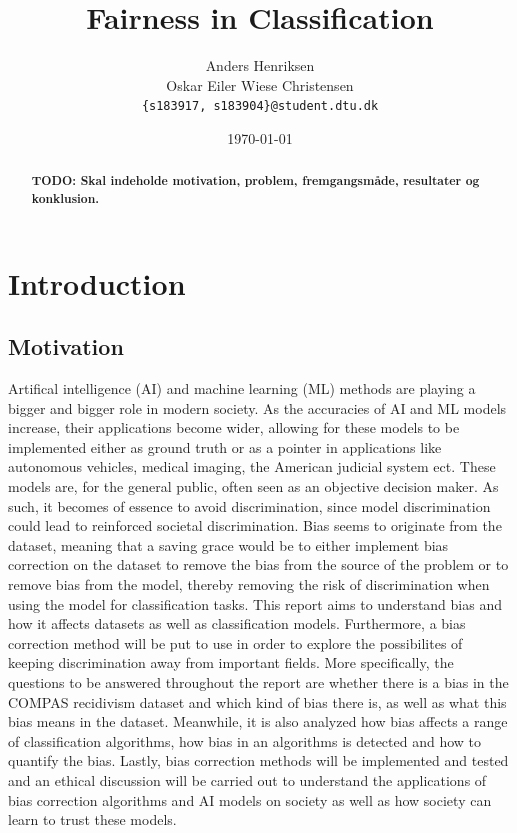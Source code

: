 \documentclass[11pt, fleqn, titlepage]{article}
\title{Fairness in Classification}
\author{Anders Henriksen \\ Oskar Eiler Wiese Christensen  \\ \texttt{\{s183917, s183904\}@student.dtu.dk}}
\date{\today}
\begin{document}
	
	\maketitle
	\begin{abstract}
		\textbf{TODO: Skal indeholde motivation, problem, fremgangsmåde, resultater og konklusion.} \\ \lipsum[1-2]
	\end{abstract}
	\tableofcontents \newpage
	
	\section{Introduction} \label{indledning}
	
	\subsection{Motivation}
	Artifical intelligence (AI) and machine learning (ML) methods are playing a bigger and bigger role in modern society. As the accuracies of AI and ML models increase, their applications become wider, allowing for these  models to be implemented either as ground truth or as a pointer in applications like autonomous vehicles, medical imaging, the American judicial system ect. These models are, for the general public, often seen as an objective decision maker. As such, it becomes of essence to avoid discrimination, since model discrimination could lead to reinforced societal discrimination. Bias seems to originate from the dataset, meaning that a saving grace would be to either implement bias correction on the dataset to remove the bias from the source of the problem or to remove bias from the model, thereby removing the risk of discrimination when using the model for classification tasks. This report aims to understand bias and how it affects datasets as well as classification models. Furthermore, a bias correction method will be put to use in order to explore the possibilites of keeping discrimination away from important fields. More specifically, the questions to be answered throughout the report are whether there is a bias in the COMPAS recidivism dataset and which kind of bias there is, as well as what this bias means in the dataset. Meanwhile, it is also analyzed how bias affects a range of classification algorithms, how bias in an algorithms is detected and how to quantify the bias. Lastly, bias correction methods will be implemented and tested and an ethical discussion will be carried out to understand the applications of bias correction algorithms and AI models on society as well as how society can learn to trust these models. \\
	
\end{document}
